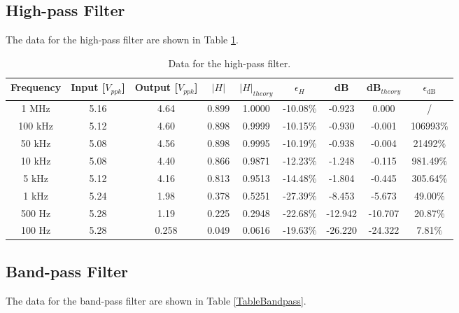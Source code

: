 \documentclass{article}
\begin{document}
\subsection{High-pass Filter}
The data for the high-pass filter are shown in Table \ref{TableHighpass}.

\begin{table}[H]\centering
    \begin{tabular}{ccccccccc}
        \toprule
        Frequency & Input [$V_{ppk}$] & Output [$V_{ppk}$] & $|H|$  & $|H|_{theory}$ & $\epsilon_H$ & dB       & dB$_{theory}$ & $\epsilon_{\text{dB}}$ \\
        \midrule
        1 MHz     & 5.16              & 4.64               & 0.899 & 1.0000         & -10.08$\%$     & -0.923  & 0.000       & /                 \\
        100 kHz   & 5.12              & 4.60               & 0.898 & 0.9999         & -10.15$\%$     & -0.930  & -0.001      & 106993$\%$             \\
        50 kHz    & 5.08              & 4.56               & 0.898 & 0.9995         & -10.19$\%$     & -0.938  & -0.004      & 21492$\%$               \\
        10 kHz    & 5.08              & 4.40               & 0.866 & 0.9871         & -12.23$\%$     & -1.248  & -0.115      & 981.49$\%$              \\
        5 kHz     & 5.12              & 4.16               & 0.813 & 0.9513         & -14.48$\%$     & -1.804  & -0.445      & 305.64$\%$              \\
        1 kHz     & 5.24              & 1.98               & 0.378 & 0.5251         & -27.39$\%$     & -8.453  & -5.673      & 49.00$\%$               \\
        500 Hz    & 5.28              & 1.19               & 0.225 & 0.2948         & -22.68$\%$     & -12.942 & -10.707     & 20.87$\%$              \\
        100 Hz    & 5.28              & 0.258              & 0.049 & 0.0616         & -19.63$\%$     & -26.220 & -24.322     & 7.81$\%$             \\
        \bottomrule
    \end{tabular}
    \caption{Data for the high-pass filter.}\label{TableHighpass}
\end{table}

\subsection{Band-pass Filter}
The data for the band-pass filter are shown in Table \ref{TableBandpass}.
\end{document}
